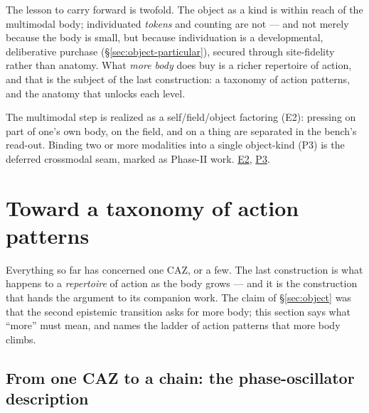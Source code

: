 \documentclass{article}
\newcommand{\rtdlink}[2]{\href{https://smn-lab.readthedocs.io/en/latest/#1}{#2}}
\begin{document}
The lesson to carry forward is twofold.  The object as a kind is within
reach of the multimodal body; individuated \emph{tokens} and counting are
not --- and not merely because the body is small, but because
individuation is a developmental, deliberative purchase
(\S\ref{sec:object-particular}), secured through site-fidelity rather than
anatomy.  What \emph{more body} does buy is a richer repertoire of action,
and that is the subject of the last construction: a taxonomy of action
patterns, and the anatomy that unlocks each level.

\begin{benchbox}
The multimodal step is realized as a self/field/object factoring (E2):
pressing on part of one's own body, on the field, and on a thing are
separated in the bench's read-out.  Binding two or more modalities into a
single object-kind (P3) is the deferred crossmodal seam, marked as
Phase-II work.  \rtdlink{experiments/p5_self_field_object/}{E2},
\rtdlink{experiments/p3_crossmodal_discrimination/}{P3}.
\end{benchbox}

\section{Toward a taxonomy of action patterns}\label{sec:taxonomy}

Everything so far has concerned one CAZ, or a few.  The last
construction is what happens to a \emph{repertoire} of action as the body
grows --- and it is the construction that hands the argument to its
companion work.  The claim of \S\ref{sec:object} was that the second
epistemic transition asks for more body; this section says what ``more''
must mean, and names the ladder of action patterns that more body
climbs.

\subsection{From one CAZ to a chain: the phase-oscillator
description}\label{sec:tax-oscillator}
\end{document}
